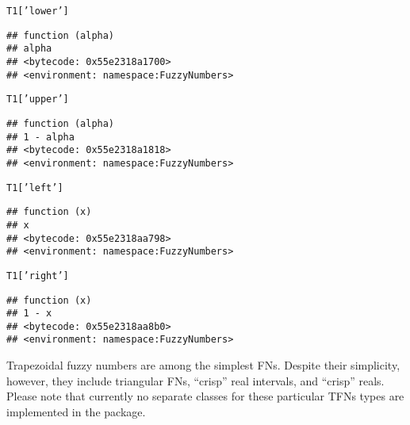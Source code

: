 \documentclass[11pt]{article}\usepackage[]{graphicx}\usepackage[]{color}
\makeatletter
\newcommand{\hlstr}[1]{\textcolor[rgb]{0.192,0.494,0.8}{#1}}%
\newcommand{\hlstd}[1]{\textcolor[rgb]{0.345,0.345,0.345}{#1}}%
\newenvironment{kframe}{%
 \def\at@end@of@kframe{}%
 \ifinner\ifhmode%
  \def\at@end@of@kframe{\end{minipage}}%
  \begin{minipage}{\columnwidth}%
 \fi\fi%
 \def\FrameCommand##1{\hskip\@totalleftmargin \hskip-\fboxsep
 \colorbox{shadecolor}{##1}\hskip-\fboxsep
     \hskip-\linewidth \hskip-\@totalleftmargin \hskip\columnwidth}%
 \MakeFramed {\advance\hsize-\width
   \@totalleftmargin\z@ \linewidth\hsize
   \@setminipage}}%
 {\par\unskip\endMakeFramed%
 \at@end@of@kframe}
\newenvironment{knitrout}{}{} %
\makeatother
\begin{document}
\begin{knitrout}\small
{}\color{fgcolor}\begin{kframe}
\begin{alltt}
\hlstd{T1[}\hlstr{'lower'}\hlstd{]}
\end{alltt}
\begin{verbatim}
## function (alpha) 
## alpha
## <bytecode: 0x55e2318a1700>
## <environment: namespace:FuzzyNumbers>
\end{verbatim}
\begin{alltt}
\hlstd{T1[}\hlstr{'upper'}\hlstd{]}
\end{alltt}
\begin{verbatim}
## function (alpha) 
## 1 - alpha
## <bytecode: 0x55e2318a1818>
## <environment: namespace:FuzzyNumbers>
\end{verbatim}
\begin{alltt}
\hlstd{T1[}\hlstr{'left'}\hlstd{]}
\end{alltt}
\begin{verbatim}
## function (x) 
## x
## <bytecode: 0x55e2318aa798>
## <environment: namespace:FuzzyNumbers>
\end{verbatim}
\begin{alltt}
\hlstd{T1[}\hlstr{'right'}\hlstd{]}
\end{alltt}
\begin{verbatim}
## function (x) 
## 1 - x
## <bytecode: 0x55e2318aa8b0>
## <environment: namespace:FuzzyNumbers>
\end{verbatim}
\end{kframe}
\end{knitrout}



\bigskip
Trapezoidal fuzzy numbers are among the simplest FNs.
Despite their simplicity, however, they include triangular FNs,
``crisp'' real intervals, and ``crisp'' reals.
Please note that currently no separate classes for these particular TFNs types
are implemented in the package.
\end{document}
